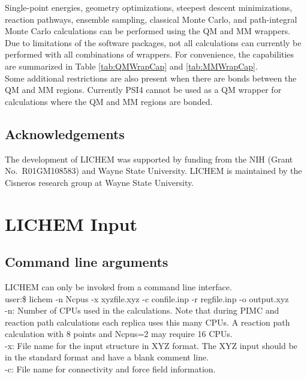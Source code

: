 \documentclass[12pt]{report}
\begin{document}
Single-point energies, geometry optimizations, steepest descent minimizations,
reaction pathways, ensemble sampling, classical Monte Carlo, and
path-integral Monte Carlo calculations can be performed using the QM and MM
wrappers.
Due to limitations of the software packages, not all calculations can
currently be performed with all combinations of wrappers.
For convenience, the capabilities are summarized in Table \ref{tab:QMWrapCap}
and \ref{tab:MMWrapCap}. \\

Some additional restrictions are also present when there are bonds between
the QM and MM regions.
Currently PSI4 cannot be used as a QM wrapper for calculations where the QM
and MM regions are bonded.

\section{Acknowledgements}

The development of LICHEM was supported by funding from the NIH (Grant No.\
R01GM108583) and Wayne State University.
LICHEM is maintained by the Cisneros research group at Wayne State University.

\chapter{LICHEM Input}

\section{Command line arguments}

LICHEM can only be invoked from a command line interface. \\

user:\$ lichem -n Ncpus -x xyzfile.xyz -c confile.inp
-r regfile.inp -o output.xyz \\

-n: Number of CPUs used in the calculations.
Note that during PIMC and reaction path calculations each replica uses this
many CPUs.
A reaction path calculation with 8 points and Ncpus=2 may require 16 CPUs. \\

-x: File name for the input structure in XYZ format.
The XYZ input should be in the standard format and have a blank comment
line. \\

-c: File name for connectivity and force field information. \\
\end{document}
